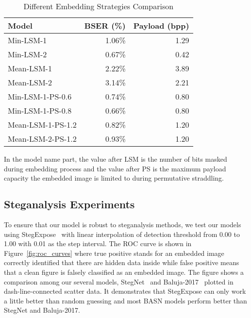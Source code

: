 \begin{table}
  \centering
  \begin{tabular}{lrr}
    \toprule
    Model             & BSER (\%) & Payload (bpp) \\
    \midrule
    Min-LSM-1         & 1.06\%    & 1.29          \\
    Min-LSM-2         & 0.67\%    & 0.42          \\
    Mean-LSM-1        & 2.22\%    & 3.89          \\
    Mean-LSM-2        & 3.14\%    & 2.21          \\
    Min-LSM-1-PS-0.6  & 0.74\%    & 0.80          \\
    Min-LSM-1-PS-0.8  & 0.66\%    & 0.80          \\
    Mean-LSM-1-PS-1.2 & 0.82\%    & 1.20          \\
    Mean-LSM-2-PS-1.2 & 0.93\%    & 1.20          \\
    \bottomrule
  \end{tabular}
  \caption{Different Embedding Strategies Comparison}%
  \label{tab:diff_strategies_comparison}
  \vspace{\baselineskip}
  In the model name part, the value after LSM is the number of bits masked during embedding process and the value after PS is the maximum payload capacity the embedded image is limited to during permutative straddling.
\end{table}

\figureSteganographyResultMeanLSMOne%

\subsection{Steganalysis Experiments}

To ensure that our model is robust to steganalysis methods, we test our models using StegExpose~\cite{StegExpose} with linear interpolation of detection threshold from 0.00 to 1.00 with 0.01 as the step interval. The ROC curve is shown in Figure~\ref{fig:roc_curves} where true positive stands for an embedded image correctly identified that there are hidden data inside while false positive means that a clean figure is falsely classified as an embedded image. The figure shows a comparison among our several models, StegNet~\cite{StegNet} and Baluja-2017~\cite{HIPS} plotted in dash-line-connected scatter data. It demonstrates that StegExpose can only work a little better than random guessing and most BASN models perform better than StegNet and Baluja-2017.

